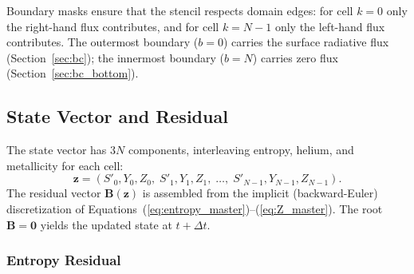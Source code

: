 \documentclass{aastex631}
\begin{document}
Boundary masks ensure that the stencil respects domain edges: for
cell $k=0$ only the right-hand flux contributes, and for cell
$k=N-1$ only the left-hand flux contributes.  The outermost boundary
($b=0$) carries the surface radiative flux
(Section~\ref{sec:bc}); the innermost boundary ($b=N$) carries zero
flux (Section~\ref{sec:bc_bottom}).

\subsection{State Vector and Residual}\label{sec:residual}

The state vector has $3N$ components, interleaving entropy,
helium, and metallicity for each cell:
\begin{equation}\label{eq:state_vec}
  \mathbf{z} = (S'_0, Y_0, Z_0,\; S'_1, Y_1, Z_1,\; \ldots,\;
                S'_{N-1}, Y_{N-1}, Z_{N-1}).
\end{equation}
The residual vector $\mathbf{B}(\mathbf{z})$ is assembled from the
implicit (backward-Euler) discretization of
Equations~(\ref{eq:entropy_master})--(\ref{eq:Z_master}).
The root $\mathbf{B}=\mathbf{0}$ yields the updated state at
$t+\Delta t$.

\subsubsection{Entropy Residual}
\end{document}
